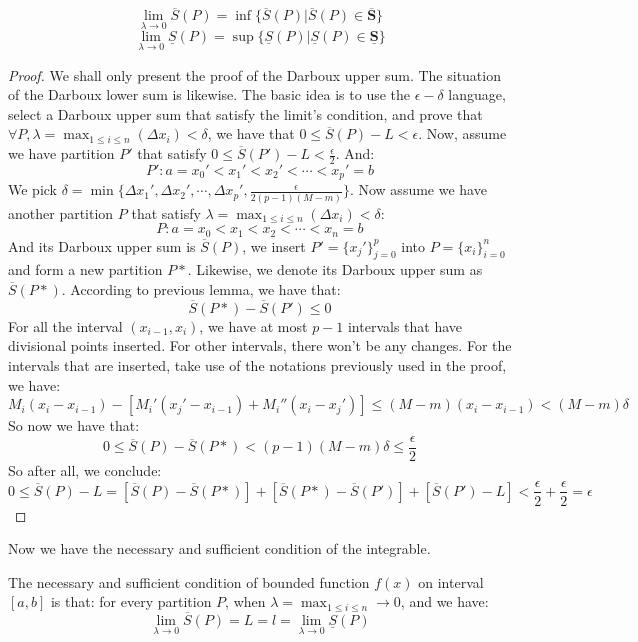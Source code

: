 \documentclass[oneside]{book}
\begin{document}
\begin{lemma}
\[\lim_{\lambda \to 0} \overline{S}(P) = \inf \{\overline{S}(P)|\overline{S}(P) \in \overline{\textbf{S}}\}\]
\[\lim_{\lambda \to 0} \underline{S}(P) = \sup \{\underline{S}(P)|\underline{S}(P) \in \underline{\textbf{S}}\}\]
\end{lemma}

\begin{proof}
We shall only present the proof of the Darboux upper sum. The situation of the Darboux lower sum is likewise.
The basic idea is to use the $\epsilon - \delta$ language, select a Darboux upper sum that satisfy the limit's condition, and prove that $\forall P, \lambda = \max_{1 \leq i \leq n} (\Delta x_i) < \delta$, we have that $0 \leq \overline{S}(P)-L < \epsilon$.
Now, assume we have partition $P'$ that satisfy $0 \leq \overline{S}(P') - L < \frac{\epsilon}{2}$. And:
\[P' : a = x_0' <x_1' < x_2' < \cdots < x_p' = b\]
We pick $\delta = \min \{\Delta x_1', \Delta x_2', \cdots , \Delta x_p', \frac{\epsilon}{2(p-1)(M-m)}\}$.
Now assume we have another partition $P$ that satisfy $\lambda = \max_{1 \leq i \leq n} (\Delta x_i) < \delta$:
\[
P: a = x_0 < x_1 < x_2 < \cdots <x_n = b
\]
And its Darboux upper sum is $\overline{S}(P)$, we insert $P' = \{x_j'\}^p_{j=0}$ into $P = \{x_i\}^n_{i=0}$ and form a new partition $P*$. Likewise, we denote its Darboux upper sum as $\overline{S}(P*)$.
According to previous lemma, we have that:
\[\overline{S}(P*)-\overline{S}(P') \leq 0\]
For all the interval $(x_{i-1},x_i)$, we have at most $p-1$ intervals that have divisional points inserted. For other intervals, there won't be any changes.
For the intervals that are inserted, take use of the notations previously used in the proof, we have:
\[
M_i(x_i-x_{i-1})-[M_i'(x_j'-x_{i-1})+M_i''(x_i-x_j')] \leq (M-m) (x_i-x_{i-1}) < (M-m) \delta
\]
So now we have that:
\[
0 \leq \overline{S}(P)-\overline{S}(P*)<(p-1)(M-m)\delta \leq \frac{\epsilon}{2}
\]
So after all, we conclude:
\[
0 \leq \overline{S}(P)-L = [\overline{S}(P)-\overline{S}(P*)]+[\overline{S}(P*)-\overline{S}(P')]+[\overline{S}(P')-L]<\frac{\epsilon}{2}+\frac{\epsilon}{2}=\epsilon
\]
\end{proof}

Now we have the necessary and sufficient condition of the integrable.

\newpage

\begin{theorem}
The necessary and sufficient condition of bounded function $f(x)$ on interval $[a,b]$ is that: for every partition $P$, when $\lambda = \max_{1 \leq i \leq n} \to 0$, and we have:
\[
\lim_{\lambda \to 0} \overline{S}(P) = L = l = \lim_{\lambda \to 0} \underline{S}(P)
\]
\end{theorem}
\end{document}
